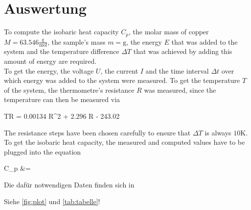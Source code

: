 \section{Auswertung}
\label{sec:Auswertung}
To compute the isobaric heat capacity $C_p$, the molar mass of copper $M = 63.546\frac{\text{g}}{\text{mol}}$, the sample's mass $m = \text{g}$, the energy $E$ that was added to the system and the temperature difference $\Delta T$ that was achieved by adding this amount of energy are required. \\
To get the energy, the voltage $U$, the current $I$ and the time interval $\Delta t$ over which energy was added to the system were measured. To get the temperature $T$ of the system, the thermometre's resistance $R$ was measured, since the temperature can then be measured via
\begin{aquation}
  T\lbr R \rbr = 0.00134 R^2 + 2.296 R - 243.02 \tp
\end{aquation}
The resistance steps have been chosen carefully to ensure that $\Delta T$ is always $10\text{K}$. To get the isobaric heat capacity, the measured and computed values have to be plugged into the equation 
\begin{aquation}
  C_p &=  \tp
\end{aquation}
Die dafür notwendigen Daten finden sich in 





Siehe \autoref{fig:plot} und \autoref{tab:tabelle}!

